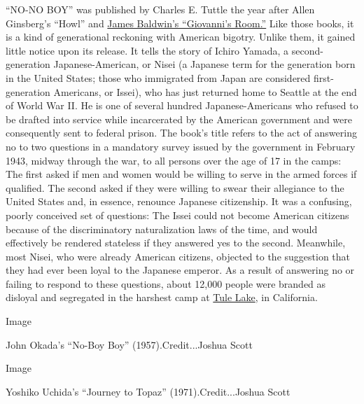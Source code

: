 ``NO-NO BOY'' was published by Charles E. Tuttle the year after Allen
Ginsberg's ``Howl'' and
\href{https://www.nytimes3xbfgragh.onion/2019/09/05/t-magazine/james-baldwin-giovannis-room.html}{James
Baldwin's ``Giovanni's Room.''} Like those books, it is a kind of
generational reckoning with American bigotry. Unlike them, it gained
little notice upon its release. It tells the story of Ichiro Yamada, a
second-generation Japanese-American, or Nisei (a Japanese term for the
generation born in the United States; those who immigrated from Japan
are considered first-generation Americans, or Issei), who has just
returned home to Seattle at the end of World War II. He is one of
several hundred Japanese-Americans who refused to be drafted into
service while incarcerated by the American government and were
consequently sent to federal prison. The book's title refers to the act
of answering no to two questions in a mandatory survey issued by the
government in February 1943, midway through the war, to all persons over
the age of 17 in the camps: The first asked if men and women would be
willing to serve in the armed forces if qualified. The second asked if
they were willing to swear their allegiance to the United States and, in
essence, renounce Japanese citizenship. It was a confusing, poorly
conceived set of questions: The Issei could not become American citizens
because of the discriminatory naturalization laws of the time, and would
effectively be rendered stateless if they answered yes to the second.
Meanwhile, most Nisei, who were already American citizens, objected to
the suggestion that they had ever been loyal to the Japanese emperor. As
a result of answering no or failing to respond to these questions, about
12,000 people were branded as disloyal and segregated in the harshest
camp at
\href{https://www.nytimes3xbfgragh.onion/video/us/100000005024375/japanese-internment-tule-lake-360-video.html}{Tule
Lake}, in California.

Image

John Okada's ``No-Boy Boy'' (1957).Credit...Joshua Scott

Image

Yoshiko Uchida's ``Journey to Topaz'' (1971).Credit...Joshua Scott

